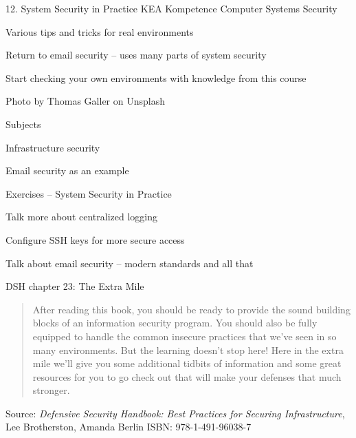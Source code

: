 \documentclass[Screen16to9,17pt]{foils}
\begin{document}
\mytitlepage
{12. System Security in Practice}
{KEA Kompetence Computer Systems Security \the\year}





\begin{list2}
\item Various tips and tricks for real environments
\item Return to email security -- uses many parts of system security
\item Start checking your own environments with knowledge from this course
\end{list2}

{\small\hfill  Photo by Thomas Galler on Unsplash}


\begin{list1}
\item Subjects
\begin{list2}
\item Infrastructure security
\item Email security as an example
\end{list2}
\item Exercises -- System Security in Practice
\begin{list2}
\item Talk more about centralized logging
\item Configure SSH keys for more secure access
\item Talk about email security -- modern standards and all that
\end{list2}
\end{list1}




DSH chapter 23: The Extra Mile
\begin{quote}
After reading this book, you should be ready to provide the sound building blocks of
an information security program. You should also be fully equipped to handle the
common insecure practices that we’ve seen in so many environments. But the learning doesn’t stop here! Here in the extra mile we’ll give you some additional tidbits of
information and some great resources for you to go check out that will make your
defenses that much stronger.
\end{quote}
Source: \emph{Defensive Security Handbook: Best Practices for Securing Infrastructure}, Lee Brotherston, Amanda Berlin ISBN: 978-1-491-96038-7
\end{document}
